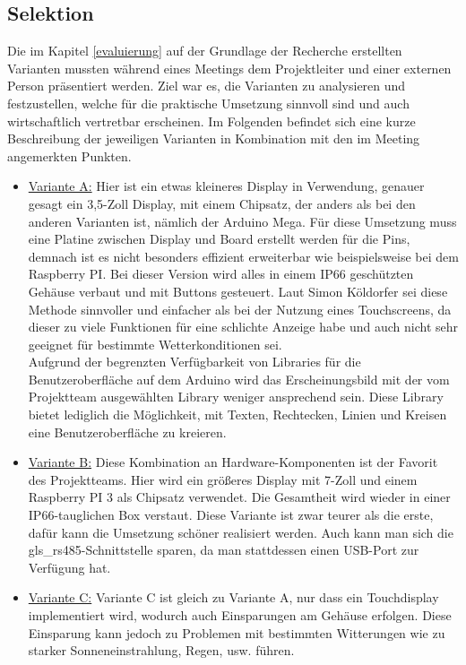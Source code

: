 \newpage
\subsection{Selektion} \label{selektion}
Die im Kapitel \ref{evaluierung} auf der Grundlage der Recherche erstellten Varianten mussten während eines Meetings dem Projektleiter und einer externen Person präsentiert werden. Ziel war es, die Varianten zu analysieren und festzustellen, welche für die praktische Umsetzung sinnvoll sind und auch wirtschaftlich vertretbar erscheinen. Im Folgenden befindet sich eine kurze Beschreibung der jeweiligen Varianten in Kombination mit den im Meeting angemerkten Punkten.

\begin{itemize}
	\item \underline{Variante A:} Hier ist ein etwas kleineres Display in Verwendung, genauer gesagt ein 3,5-Zoll Display, mit einem Chipsatz, der anders als bei den anderen Varianten ist, nämlich der Arduino Mega. Für diese Umsetzung muss eine Platine zwischen Display und Board erstellt werden für die Pins, demnach ist es nicht besonders effizient erweiterbar wie beispielsweise bei dem Raspberry PI. Bei dieser Version wird alles in einem IP66 geschützten Gehäuse verbaut und mit Buttons gesteuert. Laut Simon Köldorfer sei diese Methode sinnvoller und einfacher als bei der Nutzung eines Touchscreens, da dieser zu viele Funktionen für eine schlichte Anzeige habe und auch nicht sehr geeignet für bestimmte Wetterkonditionen sei. \\
	Aufgrund der begrenzten Verfügbarkeit von Libraries für die Benutzeroberfläche auf dem Arduino wird das Erscheinungsbild mit der vom Projektteam ausgewählten Library weniger ansprechend sein. Diese Library bietet lediglich die Möglichkeit, mit Texten, Rechtecken, Linien und Kreisen eine Benutzeroberfläche zu kreieren.
	\item \underline{Variante B:} Diese Kombination an Hardware-Komponenten ist der Favorit des Projektteams. Hier wird ein größeres Display mit 7-Zoll und einem Raspberry PI 3 als Chipsatz verwendet. Die Gesamtheit wird wieder in einer IP66-tauglichen Box verstaut. Diese Variante ist zwar teurer als die erste, dafür kann die Umsetzung schöner realisiert werden. Auch kann man sich die \gls{gls_rs485}-Schnittstelle sparen, da man stattdessen einen USB-Port zur Verfügung hat.
	\item \underline{Variante C:} Variante C ist gleich zu Variante A, nur dass ein Touchdisplay implementiert wird, wodurch auch Einsparungen am Gehäuse erfolgen. Diese Einsparung kann jedoch zu Problemen mit bestimmten Witterungen wie zu starker Sonneneinstrahlung, Regen, usw. führen. 

\end{itemize}
